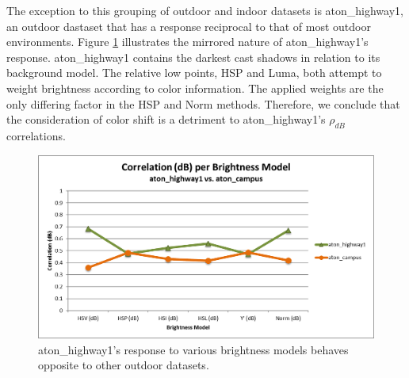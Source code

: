 The exception to this grouping of outdoor and indoor datasets is aton\_highway1, an outdoor dastaset that has a response reciprocal to that of most outdoor environments. Figure \ref{fig:highway1_reciprocal} illustrates the mirrored nature of aton\_highway1's response. 
aton\_highway1 contains the darkest cast shadows in relation to its background model. The relative low points, HSP and Luma, both attempt to weight brightness according to color information. The applied weights are the only differing factor in the HSP and Norm methods. Therefore, we conclude that the consideration of color shift is a detriment to aton\_highway1's $\rho_{dB}$ correlations.

\begin{figure}
\centering
  \includegraphics[width=1\linewidth]{figures/highway1_reciprocal.jpg}
\caption{aton\_highway1's response to various brightness models behaves opposite to other outdoor datasets.}
\label{fig:highway1_reciprocal}
\end{figure}

\FloatBarrier
